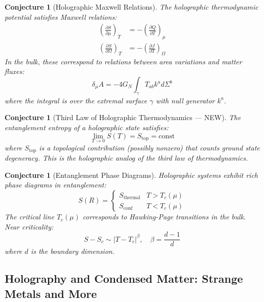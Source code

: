 \documentclass[12pt,a4paper]{article}
\newtheorem{conjecture}[theorem]{Conjecture}
\begin{document}
\begin{conjecture}[Holographic Maxwell Relations]
The holographic thermodynamic potential satisfies Maxwell relations:
\begin{align}
\left( \frac{\partial S}{\partial \mu} \right)_T &= -\left( \frac{\partial Q}{\partial T} \right)_\mu \\
\left( \frac{\partial S}{\partial \Omega} \right)_T &= -\left( \frac{\partial J}{\partial T} \right)_\Omega
\end{align}
In the bulk, these correspond to relations between area variations and matter fluxes:
\begin{equation}
\delta_\mu A = -4G_N \int_{\gamma} T_{ab} k^a d\Sigma^b
\end{equation}
where the integral is over the extremal surface $\gamma$ with null generator $k^a$.
\end{conjecture}

\begin{conjecture}[Third Law of Holographic Thermodynamics --- NEW]
The entanglement entropy of a holographic state satisfies:
\begin{equation}
\lim_{T \to 0} S(T) = S_{\text{top}} = \text{const}
\end{equation}
where $S_{\text{top}}$ is a topological contribution (possibly nonzero) that counts ground state degeneracy. This is the holographic analog of the third law of thermodynamics.
\end{conjecture}

\begin{conjecture}[Entanglement Phase Diagrams]
Holographic systems exhibit rich phase diagrams in entanglement:
\begin{equation}
S(R) = \begin{cases}
S_{\text{thermal}} & T > T_c(\mu) \\
S_{\text{conf}} & T < T_c(\mu)
\end{cases}
\end{equation}
The critical line $T_c(\mu)$ corresponds to Hawking-Page transitions in the bulk. Near criticality:
\begin{equation}
S - S_c \sim |T - T_c|^\beta, \quad \beta = \frac{d-1}{d}
\end{equation}
where $d$ is the boundary dimension.
\end{conjecture}

\subsection{Holography and Condensed Matter: Strange Metals and More}
\end{document}
